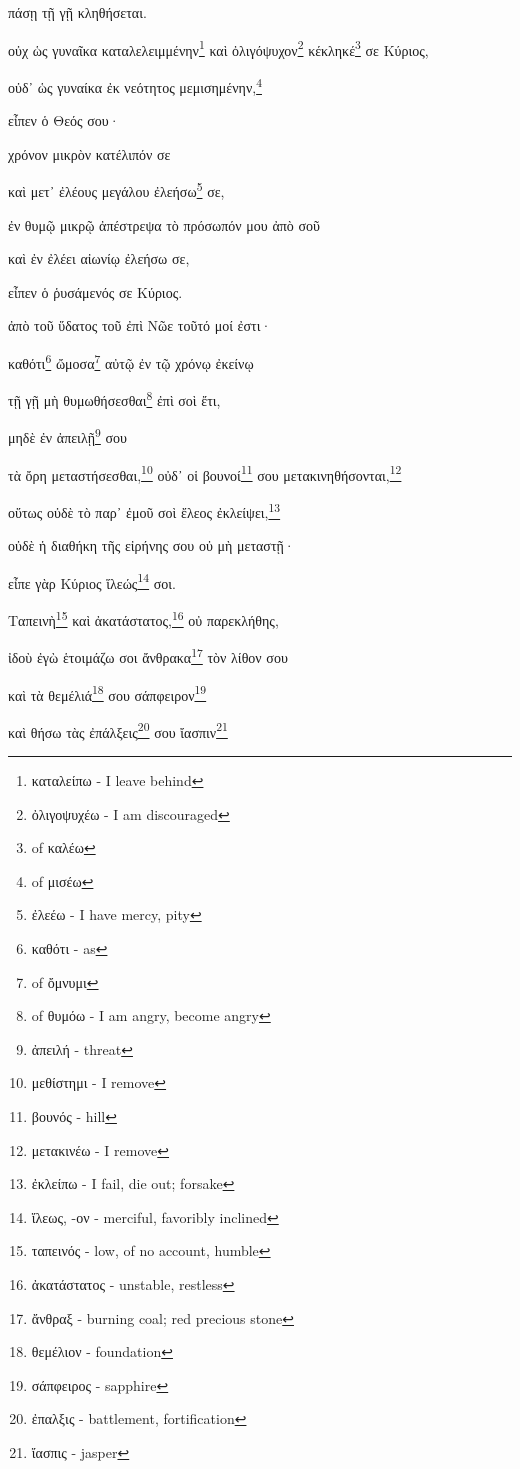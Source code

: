 πάσῃ
τῇ
γῇ
κληθήσεται.

οὐχ
ὡς
γυναῖκα
καταλελειμμένην\footnote{καταλείπω - I leave behind}
καὶ
ὀλιγόψυχον\footnote{ὀλιγοψυχέω - I am discouraged}
κέκληκέ\footnote{ of καλέω}
σε
Κύριος,

οὐδ᾽
ὡς
γυναίκα
ἐκ
νεότητος
μεμισημένην,\footnote{ of μισέω}

εἶπεν
ὁ
Θεός
σου·

χρόνον
μικρὸν
κατέλιπόν
σε

καὶ
μετ᾽
ἐλέους
μεγάλου
ἐλεήσω\footnote{ἐλεέω - I have mercy, pity}
σε,

ἐν
θυμῷ
μικρῷ
ἀπέστρεψα
τὸ
πρόσωπόν
μου
ἀπὸ
σοῦ

καὶ
ἐν
ἐλέει
αἰωνίῳ
ἐλεήσω
σε,

εἶπεν
ὁ
ῥυσάμενός
σε
Κύριος.

ἀπὸ
τοῦ
ὕδατος
τοῦ
ἐπὶ
Νῶε
τοῦτό
μοί
ἐστι·

καθότι\footnote{καθότι - as}
ὤμοσα\footnote{ of ὄμνυμι}
αὐτῷ
ἐν
τῷ
χρόνῳ
ἐκείνῳ

τῇ
γῇ
μὴ
θυμωθήσεσθαι\footnote{ of θυμόω - I am angry, become angry}
ἐπὶ
σοὶ
ἔτι,

μηδὲ
ἐν
ἀπειλῇ\footnote{ἀπειλή - threat}
σου

τὰ
ὄρη
μεταστήσεσθαι,\footnote{μεθίστημι - I remove}
οὐδ᾿
οἱ
βουνοί\footnote{βουνός - hill}
σου
μετακινηθήσονται,\footnote{μετακινέω - I remove}

οὕτως
οὐδὲ
τὸ
παρ᾽
ἐμοῦ
σοὶ
ἔλεος
ἐκλείψει,\footnote{ἐκλείπω - I fail, die out; forsake}

οὐδὲ
ἡ
διαθήκη
τῆς
εἰρήνης
σου
οὐ
μὴ
μεταστῇ·

εἶπε
γὰρ
Κύριος
ἵλεώς\footnote{ἵλεως, -ον - merciful, favoribly inclined}
σοι.

Ταπεινὴ\footnote{ταπεινός - low, of no account, humble}
καὶ
ἀκατάστατος,\footnote{ἀκατάστατος - unstable, restless}
οὐ
παρεκλήθης,

ἰδοὺ
ἐγὼ
ἑτοιμάζω
σοι
ἄνθρακα\footnote{ἄνθραξ - burning coal; red precious stone}
τὸν
λίθον
σου

καὶ
τὰ
θεμέλιά\footnote{θεμέλιον - foundation}
σου
σάπφειρον\footnote{σάπφειρος - sapphire}

καὶ
θήσω
τὰς
ἐπάλξεις\footnote{ἐπαλξις - battlement, fortification}
σου
ἴασπιν\footnote{ἴασπις - jasper}

